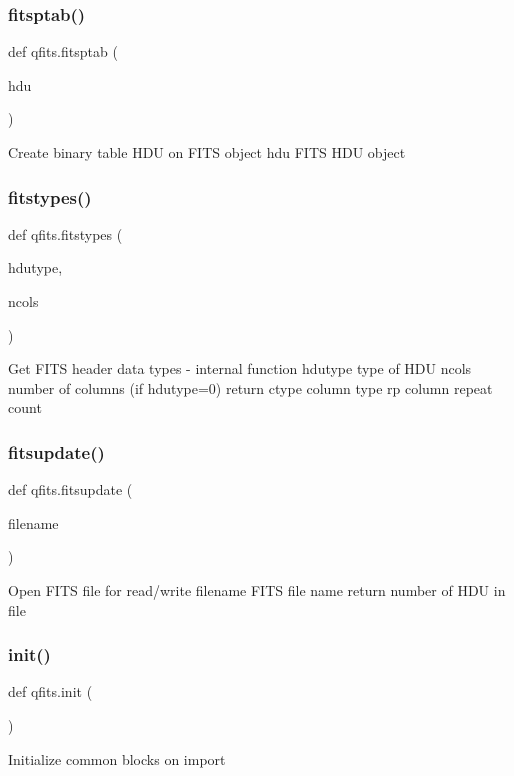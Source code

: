 \subsubsection{\texorpdfstring{fitsptab()}{fitsptab()}}
{\footnotesize\ttfamily def qfits.\+fitsptab (\begin{DoxyParamCaption}\item[{}]{hdu }\end{DoxyParamCaption})}

\begin{DoxyVerb}Create binary table HDU on FITS object
   hdu    FITS HDU object
\end{DoxyVerb}
 \mbox{\label{namespaceqfits_a69998ab4fd7c39c53012bf441e224c9e}} 
\subsubsection{\texorpdfstring{fitstypes()}{fitstypes()}}
{\footnotesize\ttfamily def qfits.\+fitstypes (\begin{DoxyParamCaption}\item[{}]{hdutype,  }\item[{}]{ncols }\end{DoxyParamCaption})}

\begin{DoxyVerb}Get FITS header data types - internal function
    hdutype    type of HDU
    ncols      number of columns (if hdutype=0)
return    ctype   column type
          rp      column repeat count
\end{DoxyVerb}
 \mbox{\label{namespaceqfits_ae2d60441a901e17e35deaae6ff2e251b}} 
\subsubsection{\texorpdfstring{fitsupdate()}{fitsupdate()}}
{\footnotesize\ttfamily def qfits.\+fitsupdate (\begin{DoxyParamCaption}\item[{}]{filename }\end{DoxyParamCaption})}

\begin{DoxyVerb}Open FITS file for read/write
    filename    FITS file name
return   number of HDU in file
\end{DoxyVerb}
 \mbox{\label{namespaceqfits_a7264377311086208aca7e92c5c88752c}} 
\subsubsection{\texorpdfstring{init()}{init()}}
{\footnotesize\ttfamily def qfits.\+init (\begin{DoxyParamCaption}{ }\end{DoxyParamCaption})}

\begin{DoxyVerb}Initialize common blocks on import\end{DoxyVerb}
 